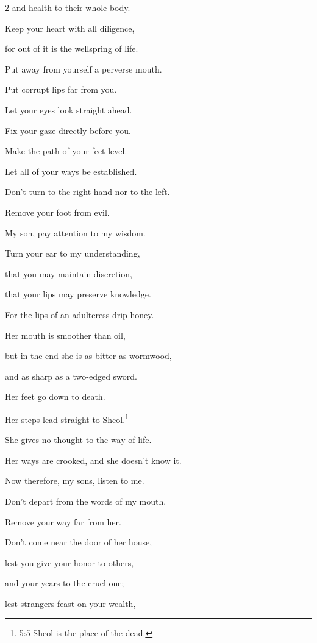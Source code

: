 \begin{multicols}{2}
and health to their whole body.


\myverse{}Keep your heart with all diligence,

for out of it is the wellspring of life.


\myverse{}Put away from yourself a perverse mouth.

Put corrupt lips far from you.


\myverse{}Let your eyes look straight ahead.

Fix your gaze directly before you.


\myverse{}Make the path of your feet level.

Let all of your ways be established.


\myverse{}Don’t turn to the right hand nor to the left.

Remove your foot from evil.


\mychapter{} \myverse*{}My son, pay attention to my wisdom.

Turn your ear to my understanding,


\myverse{}that you may maintain discretion,

that your lips may preserve knowledge.


\myverse{}For the lips of an adulteress drip honey.

Her mouth is smoother than oil,


\myverse{}but in the end she is as bitter as wormwood,

and as sharp as a two-edged sword.


\myverse{}Her feet go down to death.

Her steps lead straight to Sheol.\footnote{5:5 Sheol is the place of the dead.
}


\myverse{}She gives no thought to the way of life.

Her ways are crooked, and she doesn’t know it.


\vspace{\baselineskip} 
\myverse{}Now therefore, my sons, listen to me.

Don’t depart from the words of my mouth.


\myverse{}Remove your way far from her.

Don’t come near the door of her house,


\myverse{}lest you give your honor to others,

and your years to the cruel one;


\myverse{}lest strangers feast on your wealth,


\end{multicols}
